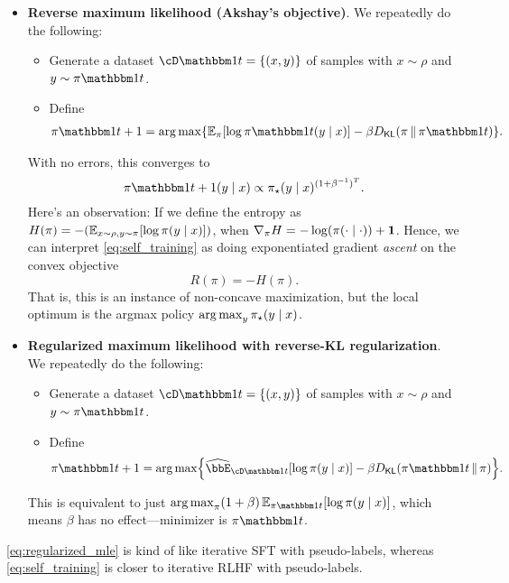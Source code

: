 \documentclass{article}
\begin{document}
\begin{itemize}
\begin{comment}
  \end{comment}
\item \textbf{Reverse maximum likelihood (Akshay's objective)}.
  We repeatedly do the following:
  \begin{itemize}
  \item Generate a dataset $\cD\ind{t}=\crl*{(x,y)}$ of samples with
    $x\sim\rho$ and $y\sim\pi\ind{t}$.
  \item Define
    \begin{align}
      \label{eq:self_training}
      \pi\ind{t+1}=\argmax\crl*{
      \En_{\pi}\brk*{\log\pi\ind{t}(y\mid{}x)}
      -\beta\Dkl{\pi}{\pi\ind{t}}
      }.
    \end{align}
  \end{itemize}
  With no errors, this converges to
  \[
    \pi\ind{t+1}(y\mid{}x)\propto{}\pistar(y\mid{}x)^{(1+\beta^{-1})^{T}}.
  \]
Here's an observation: If we define the entropy as
$H(\pi)=-\prn*{\En_{x\sim\rho{},y\sim\pi}\brk*{\log\pi(y\mid{}x)}}$, when
$\nabla_{\pi}H=-\log(\pi(\cdot\mid{}\cdot)) + \boldsymbol{1}$. Hence, we can
interpret \cref{eq:self_training} as doing exponentiated gradient
\emph{ascent} on the convex objective
\[
R(\pi) = -H(\pi).
\]
That is, this is an instance of non-concave maximization, but the
local optimum is the argmax policy $\operatorname*{arg\,max}_{y}\pi_{\star}(y\mid{}x)$.
  
  \item \textbf{Regularized maximum likelihood with reverse-KL regularization}. We repeatedly do the following:
  \begin{itemize}
  \item Generate a dataset $\cD\ind{t}=\crl*{(x,y)}$ of samples with
    $x\sim\rho$ and $y\sim\pi\ind{t}$.
  \item Define
    \begin{align}
      \label{eq:regularized_mle_reverse}
      \pi\ind{t+1}=\argmax\crl*{
      \Eh_{\cD\ind{t}}\brk*{\log\pi(y\mid{}x)}
      -\beta\Dkl{\pi\ind{t}}{\pi}
      }.
    \end{align}
  \end{itemize}
  This is equivalent to just
    $\argmax_{\pi}(1+\beta)\En_{\pi\ind{t}}\brk*{\log\pi(y\mid{}x)}$,
    which means $\beta$ has no effect---minimizer is $\pi\ind{t}$.
\end{itemize}
\cref{eq:regularized_mle} is kind of like iterative SFT with
pseudo-labels, whereas \cref{eq:self_training} is closer to iterative
RLHF with pseudo-labels.
\end{document}
